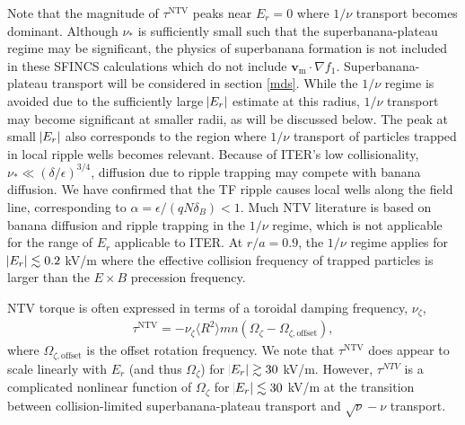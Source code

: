 \documentclass[aip, pop, preprint]{revtex4-1}
\numberwithin{figure}{section}
\numberwithin{equation}{section}
\begin{document}
Note that the magnitude of $\tau^{\text{NTV}}$ peaks near $E_r = 0$ where $1/\nu$ transport becomes dominant. Although $\nu_*$ is sufficiently small such that the superbanana-plateau regime may be significant, the physics of superbanana formation is not included in these SFINCS calculations which do not include $\bm{v}_{\text{m}} \cdot \nabla f_1$. Superbanana-plateau transport will be considered in section \ref{mds}. While the $1/\nu$ regime is avoided due to the sufficiently large $\abs{E_r}$ estimate at this radius, $1/\nu$ transport may become significant at smaller radii, as will be discussed below. The peak at small $\abs{E_r}$ also corresponds to the region where $1/\nu$ transport of particles trapped in local ripple wells becomes relevant. Because of ITER's low collisionality, $\nu_* \ll (\delta/\epsilon)^{3/4}$, diffusion due to ripple trapping may compete with banana diffusion.\cite{Garbet2010} We have confirmed that the TF ripple causes local wells along the field line, corresponding to $\alpha = \epsilon/(qN\delta_B) < 1$.\cite{Stringer1972} Much NTV literature is based on banana diffusion and ripple trapping in the $1/\nu$ regime,\cite{Stringer1972, Connor1974} which is not applicable for the range of $E_r$ applicable to ITER. At $r/a = 0.9$, the $1/\nu$ regime applies for $\abs{E_r} \lesssim 0.2$ kV/m where the effective collision frequency of trapped particles is larger than the $E \times B$ precession frequency. 

NTV torque is often expressed in terms of a toroidal damping frequency, $\nu_{\zeta}$,
\begin{gather}
\tau^{\text{NTV}} = - \nu_{\zeta} \langle R^2 \rangle m n ( \Omega_{\zeta} - \Omega_{\zeta, \text{offset}}),
\end{gather}
where $\Omega_{\zeta, \text{offset}}$ is the offset rotation frequency. We note that $\tau^{\text{NTV}}$ does appear to scale linearly with $E_r$ (and thus $\Omega_{\zeta}$) for $\abs{E_r} \gtrsim 30$ kV/m. However, $\tau^{NTV}$ is a complicated nonlinear function of $\Omega_{\zeta}$ for $\abs{E_r} \lesssim 30$ kV/m at the transition between collision-limited superbanana-plateau transport and $\sqrt{\nu}-\nu$ transport. 

\FloatBarrier
\end{document}
